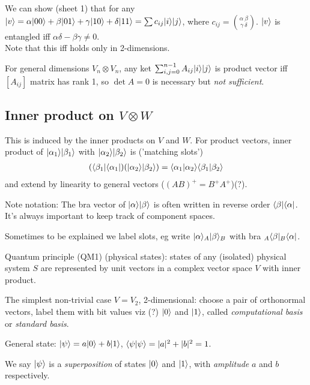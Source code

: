 \documentclass[a4paper]{article}
\begin{document}
We can show (sheet 1) that for any $|v\rangle = \alpha|00\rangle + \beta|01\rangle + \gamma|10 \rangle + \delta|11\rangle = \sum c_{ij} |i\rangle |j \rangle$, where $c_{ij} = {{\alpha\ \beta} \choose {\gamma\ \delta}}$. $|v\rangle$ is entangled iff $\alpha \delta - \beta \gamma \neq 0$. \\
Note that this iff holds only in 2-dimensions.

For general dimensions $V_n \otimes V_n$, any ket $\sum_{i,j=0}^{n-1} A_{ij} |i\rangle |j\rangle$ is product vector iff $[A_{ij}]$ matrix has rank 1, so $\det A = 0$ is necessary but \emph{not sufficient}.

\subsection{Inner product on $V \otimes W$ }
This is induced by the inner products on $V$ and $W$. For product vectors, inner product of $|\alpha_1\rangle |\beta_1 \rangle$ with $|\alpha_2\rangle |\beta_2\rangle$ is ('matching slots') 
\begin{equation*}
\begin{aligned}
(\langle\beta_1|\langle\alpha_1|) (|\alpha_2\rangle |\beta_2 \rangle) = \langle \alpha_1 | \alpha_2 \rangle \langle\beta_1|\beta_2\rangle
\end{aligned}
\end{equation*}
and extend by linearity to general vectors ($(AB)^+ = B^+ A^+$)(?).

Note notation: The bra vector of $|\alpha\rangle |\beta\rangle$ is often written in reverse order $\langle \beta | \langle\alpha|$. It's always important to keep track of component spaces.

Sometimes to be explained we label slots, eg write $|\alpha\rangle_A |\beta\rangle_B$ with bra ${}_A\langle\beta|{}_B\langle\alpha|$.
 
Quantum principle (QM1) (physical states): states of any (isolated) physical system $S$ are represented by unit vectors in a complex vector space $V$ with inner product.

The simplest non-trivial case $V=V_2$, 2-dimensional: choose a pair of orthonormal vectors, label them with bit values viz (?) $|0\rangle$ and $|1\rangle$, called \emph{computational basis} or \emph{standard basis}.

General state: $|\psi\rangle = a|0\rangle + b|1\rangle$, $\langle\psi|\psi\rangle = |a|^2+|b|^2 = 1$.

We say $|\psi\rangle$ is a \emph{superposition} of states $|0\rangle$ and $|1\rangle$, with \emph{amplitude} $a$ and $b$ respectively.
\end{document}
